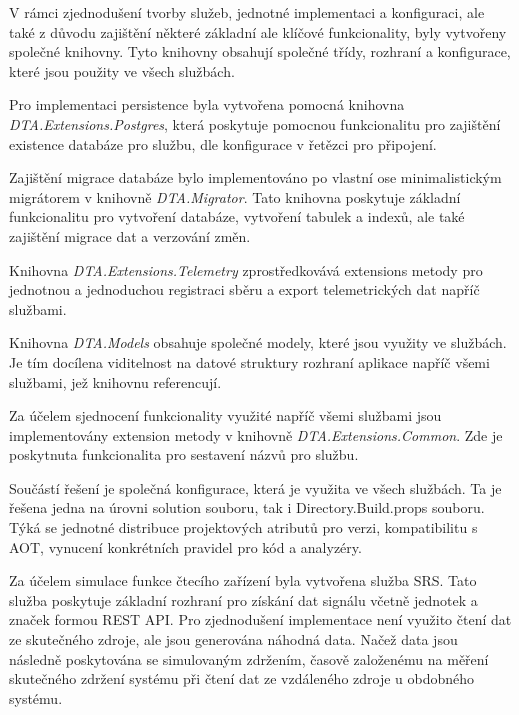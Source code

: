 
V rámci zjednodušení tvorby služeb, jednotné implementaci a konfiguraci, ale také z důvodu zajištění některé základní ale klíčové funkcionality, byly vytvořeny společné knihovny. Tyto knihovny obsahují společné třídy, rozhraní a konfigurace, které jsou použity ve všech službách.


Pro implementaci persistence byla vytvořena pomocná knihovna \\ \emph{DTA.Extensions.Postgres}, která poskytuje pomocnou funkcionalitu pro zajištění existence databáze pro službu, dle konfigurace v řetězci pro připojení.


Zajištění migrace databáze bylo implementováno po vlastní ose minimalistickým migrátorem v knihovně \emph{DTA.Migrator}. Tato knihovna poskytuje základní funkcionalitu pro vytvoření databáze, vytvoření tabulek a indexů, ale také zajištění migrace dat a verzování změn.


Knihovna \emph{DTA.Extensions.Telemetry} zprostředkovává extensions metody pro jednotnou a jednoduchou registraci sběru a export telemetrických dat napříč službami.


Knihovna \emph{DTA.Models} obsahuje společné modely, které jsou využity ve službách. Je tím docílena viditelnost na datové struktury rozhraní aplikace napříč všemi službami, jež knihovnu referencují.


Za účelem sjednocení funkcionality využité napříč všemi službami jsou implementovány extension metody v knihovně \emph{DTA.Extensions.Common}. Zde je poskytnuta funkcionalita pro sestavení názvů pro službu.


Součástí řešení je společná konfigurace, která je využita ve všech službách. Ta je řešena jedna na úrovni solution souboru, tak i Directory.Build.props souboru. Týká se jednotné distribuce projektových atributů pro verzi, kompatibilitu s AOT, vynucení konkrétních pravidel pro kód a analyzéry.


Za účelem simulace funkce čtecího zařízení byla vytvořena služba SRS. Tato služba poskytuje základní rozhraní pro získání dat signálu včetně jednotek a značek formou REST API. Pro zjednodušení implementace není využito čtení dat ze skutečného zdroje, ale jsou generována náhodná data. Načež data jsou následně poskytována se simulovaným zdržením, časově založenému na měření skutečného zdržení systému při čtení dat ze vzdáleného zdroje u obdobného systému.

